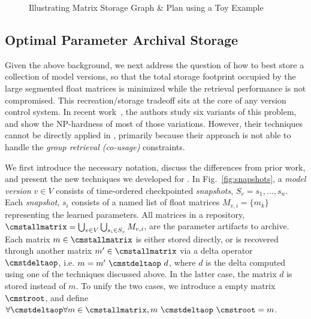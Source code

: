 \documentclass[conference]{IEEEtran}
\begin{document}
\begin{figure}[!t]
\caption{Illustrating Matrix Storage Graph \& Plan using a Toy Example}
\label{fig:optimal_archival_storage_exp}
\end{figure}

\subsection{Optimal Parameter Archival Storage}
\label{subsec:pas_version}

Given the above background, we next address the question of how to best store a collection of model versions, so that the total storage footprint occupied by the large segmented float matrices is minimized while the retrieval performance is not compromised. This recreation/storage tradeoff sits at the core of any version control system. In recent work~\cite{vldb15versioning}, the authors study six variants of this problem, and show the NP-hardness of most of those variations. %
However, their techniques cannot be directly applied in \weightstore, primarily because their approach is not able to handle the {\em group retrieval (co-usage)} constraints.



We first introduce the necessary notation, discuss the differences from prior work, and present the new techniques we developed for \weightstore.
In Fig.~\ref{fig:snapshots}, a \emph{model version} $v \in V$ consists of time-ordered checkpointed \emph{snapshots}, $S_v = {s_1, ..., s_n}$. Each \emph{snapshot}, $s_i$ consists of a named list of float matrices $M_{v,i} = \{m_k\}$ representing the learned parameters. All matrices in a repository, $\cmstallmatrix = \bigcup_{v \in V} \bigcup_{s_i \in S_v} { M_{v,i} } $, are the parameter artifacts to archive. Each matrix $m \in \cmstallmatrix$ is either stored directly, or is recovered through another matrix $m' \in \cmstallmatrix$ via a delta operator $\cmstdeltaop$, i.e. $m = m'\ \cmstdeltaop\ d$, where $d$ is the delta computed using one of the techniques discussed above. In the latter case, the matrix $d$ is stored instead of $m$. To unify the two cases, we introduce a empty matrix $\cmstroot$, and define $\forall \cmstdeltaop\forall m \in \cmstallmatrix, m\ \cmstdeltaop\ \cmstroot = m$.
\end{document}
